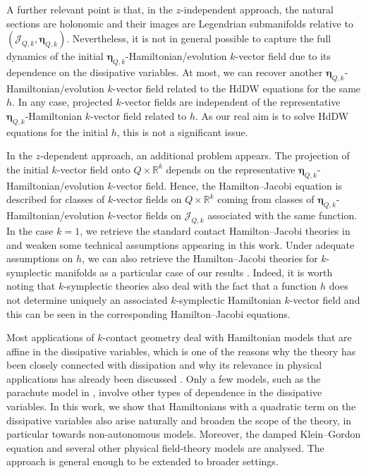 \documentclass[11pt,twoside]{article}
\theoremstyle{plain}
\theoremstyle{definition}
\theoremstyle{remark}
\begin{document}
A further relevant point is that, in the $z$-independent approach, the natural sections are holonomic and their images are Legendrian submanifolds relative to $(\mathcal{J}_{Q,k},\bm\eta_{Q,k})$. Nevertheless, it is not in general possible to capture the full dynamics of the initial $\bm\eta_{Q,k}$-Hamiltonian/evolution $k$-vector field due to its dependence on the dissipative variables. At most, we can recover another $\bm\eta_{Q,k}$-Hamiltonian/evolution $k$-vector field related to the  HdDW equations for the same $h$. In any case, projected $k$-vector fields are independent of the representative $\bm\eta_{Q,k}$-Hamiltonian $k$-vector field related to $h$. As our real aim is to solve HdDW equations for the initial $h$, this is not a significant issue. 

In the $z$-dependent approach, an additional problem appears. The projection of the initial $k$-vector field onto $Q\times \mathbb{R}^k$ depends on the representative $\bm\eta_{Q,k}$-Hamiltonian/evolution $k$-vector field. Hence, the Hamilton--Jacobi equation is described for classes of $k$-vector fields on $Q\times \mathbb{R}^k$ coming from classes of ${\bm \eta}_{Q,k}$-Hamiltonian/evolution $k$-vector fields on $\mathcal J_{Q,k}$ associated with the same function. In the case $k=1$, we retrieve the standard contact Hamilton--Jacobi theories in \cite{LLM_21a} and weaken some technical assumptions appearing in this work. Under adequate assumptions on $h$, we can also retrieve the Hamilton--Jacobi theories for $k$-symplectic manifolds as a particular case of our results \cite{DELEON2010HAMILTONJACOBITHEORIES}. Indeed, it is worth noting that $k$-symplectic theories also deal with the fact that a function $h$ does not determine uniquely an associated $k$-symplectic  Hamiltonian $k$-vector field \cite{DELEON2010HAMILTONJACOBITHEORIES} and this can be seen in the corresponding Hamilton--Jacobi equations. 

Most applications of $k$-contact geometry deal with Hamiltonian models that are affine in the dissipative variables, which is one of the reasons why the theory has been closely connected with dissipation and why its relevance in physical applications has already been discussed \cite{Riv_22,RSS_24}.
 Only a few models, such as the parachute model in \cite{GGMRR_20a}, involve other types of dependence in the dissipative variables. In this work, we show that Hamiltonians with a quadratic term on the dissipative variables also arise naturally and broaden the scope of the theory, in particular towards non-autonomous models.  Moreover, the damped Klein--Gordon equation and several other physical field-theory models are analysed. The approach is general enough to be extended to broader settings.
\end{document}
